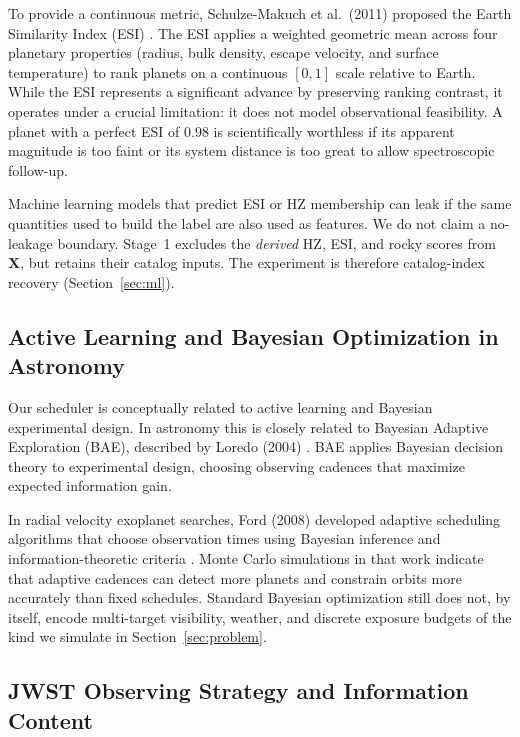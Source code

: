 \documentclass[11pt,a4paper]{article}
\begin{document}
To provide a continuous metric, Schulze-Makuch et al.\ (2011) proposed the Earth Similarity Index (ESI) \cite{schulze2011}. The ESI applies a weighted geometric mean across four planetary properties (radius, bulk density, escape velocity, and surface temperature) to rank planets on a continuous $[0,1]$ scale relative to Earth. While the ESI represents a significant advance by preserving ranking contrast, it operates under a crucial limitation: it does not model observational feasibility. A planet with a perfect ESI of 0.98 is scientifically worthless if its apparent magnitude is too faint or its system distance is too great to allow spectroscopic follow-up.

Machine learning models that predict ESI or HZ membership can leak if the same quantities used to build the label are also used as features. We do not claim a no-leakage boundary. Stage~1 excludes the \emph{derived} HZ, ESI, and rocky scores from $\mathbf{X}$, but retains their catalog inputs. The experiment is therefore catalog-index recovery (Section~\ref{sec:ml}).

\subsection{Active Learning and Bayesian Optimization in Astronomy}

Our scheduler is conceptually related to active learning and Bayesian experimental design. In astronomy this is closely related to Bayesian Adaptive Exploration (BAE), described by Loredo (2004) \cite{loredo2004}. BAE applies Bayesian decision theory to experimental design, choosing observing cadences that maximize expected information gain.

In radial velocity exoplanet searches, Ford (2008) developed adaptive scheduling algorithms that choose observation times using Bayesian inference and information-theoretic criteria \cite{ford2008}. Monte Carlo simulations in that work indicate that adaptive cadences can detect more planets and constrain orbits more accurately than fixed schedules. Standard Bayesian optimization still does not, by itself, encode multi-target visibility, weather, and discrete exposure budgets of the kind we simulate in Section~\ref{sec:problem}.

\subsection{JWST Observing Strategy and Information Content}
\end{document}
